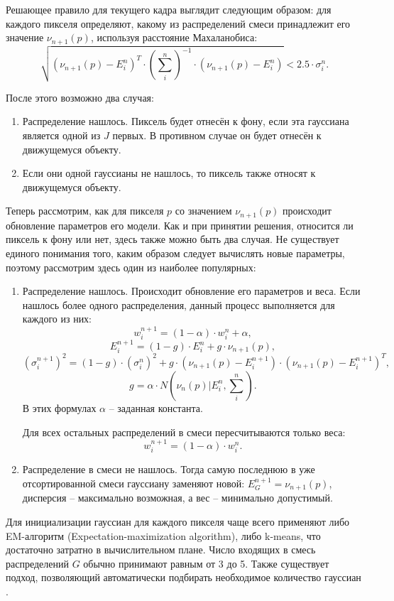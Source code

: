 Решающее правило для текущего кадра выглядит следующим образом: для каждого
пикселя определяют, какому из распределений смеси принадлежит его значение
$\nu_{n+1}(p)$, используя расстояние Махаланобиса:
\begin{equation}
	\sqrt{
	(\nu_{n+1}(p)-E^n_i)^T \cdot (\sum_i^n)^{-1} \cdot 
	(\nu_{n+1}(p) - E^n_i)} < 2.5 \cdot \sigma^n_i.
	\label{mahalabobis}
\end{equation}

После этого возможно два случая:
\begin{enumerate}
	\item Распределение нашлось. Пиксель будет отнесён к фону, если эта
гауссиана является одной из $J$ первых. В противном случае он будет отнесён
к движущемуся объекту.
	\item Если они одной гауссианы не нашлось, то пиксель также относят
к движущемуся объекту.
\end{enumerate}

Теперь рассмотрим, как для пикселя $p$ со значением $\nu_{n+1}(p)$
происходит обновление параметров его модели. Как и при принятии решения,
относится ли пиксель к фону или нет, здесь также можно быть два случая.
Не существует единого понимания того, каким образом следует вычислять новые
параметры, поэтому рассмотрим здесь один из наиболее популярных:
\begin{enumerate}
	\item Распределение нашлось. Происходит обновление его параметров и веса.
Если нашлось более одного распределения, данный процесс выполняется для каждого
из них:
$$w^{n+1}_i = (1-\alpha) \cdot w^n_i + \alpha, $$
$$ E^{n+1}_i = (1-g)\cdot E^n_i + g \cdot \nu_{n+1}(p), $$
$$ (\sigma_i^{n+1})^2 = (1-g)\cdot (\sigma_i^n)^2 + 
g \cdot (\nu_{n+1}(p) - E_i^{n+1}) \cdot (\nu_{n+1}(p) - E^{n+1}_i)^T, $$
$$ g=\alpha \cdot N(\nu_n(p)|E_i^n, \sum_i^n). $$
В этих формулах $\alpha$ -- заданная
константа.

Для всех остальных распределений в смеси пересчитываются только веса:
$$ w^{n+1}_i=(1-\alpha) \cdot w^n_i.$$
	\item Распределение в смеси не нашлось. Тогда самую последнюю в уже 
отсортированной смеси гауссиану заменяют новой: $E^{n+1}_G=\nu_{n+1}(p)$,
дисперсия -- максимально возможная, а вес -- минимально допустимый.
\end{enumerate}

Для инициализации гауссиан для каждого пикселя чаще всего применяют либо
EM-алгоритм (Expectation-maximization algorithm), либо k-means, что
достаточно затратно в вычислительном плане. Число входящих в смесь распределений
$G$ обычно принимают равным от 3 до 5. Также существует подход, позволяющий
автоматически подбирать необходимое количество гауссиан \cite{MOG-3}. 

